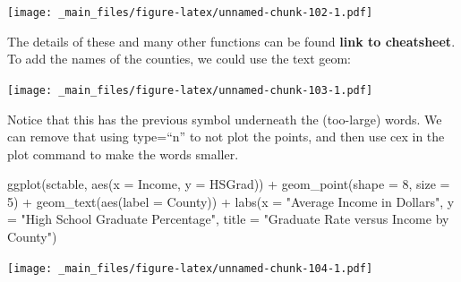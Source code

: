 \documentclass[
]{book}
\newenvironment{Shaded}{\begin{snugshade}}{\end{snugshade}}
\newcommand{\AttributeTok}[1]{\textcolor[rgb]{0.77,0.63,0.00}{#1}}
\newcommand{\DecValTok}[1]{\textcolor[rgb]{0.00,0.00,0.81}{#1}}
\newcommand{\FunctionTok}[1]{\textcolor[rgb]{0.00,0.00,0.00}{#1}}
\newcommand{\NormalTok}[1]{#1}
\newcommand{\SpecialCharTok}[1]{\textcolor[rgb]{0.00,0.00,0.00}{#1}}
\newcommand{\StringTok}[1]{\textcolor[rgb]{0.31,0.60,0.02}{#1}}
\begin{document}
\texttt{[image: \_main\_files/figure-latex/unnamed-chunk-102-1.pdf]}

The details of these and many other functions can be found \textbf{link to cheatsheet}. To add the names of the counties, we could use the text geom:

\begin{Shaded}
\end{Shaded}

\texttt{[image: \_main\_files/figure-latex/unnamed-chunk-103-1.pdf]}

Notice that this has the previous symbol underneath the (too-large) words. We can remove that using type=``n'' to not plot the points, and then use cex in the plot command to make the words smaller.

\begin{Shaded}
\begin{Highlighting}[]
\FunctionTok{ggplot}\NormalTok{(sctable, }\FunctionTok{aes}\NormalTok{(}\AttributeTok{x =}\NormalTok{ Income, }\AttributeTok{y =}\NormalTok{ HSGrad)) }\SpecialCharTok{+}
  \FunctionTok{geom\_point}\NormalTok{(}\AttributeTok{shape =} \DecValTok{8}\NormalTok{, }\AttributeTok{size =} \DecValTok{5}\NormalTok{) }\SpecialCharTok{+}
  \FunctionTok{geom\_text}\NormalTok{(}\FunctionTok{aes}\NormalTok{(}\AttributeTok{label =}\NormalTok{ County)) }\SpecialCharTok{+}
  \FunctionTok{labs}\NormalTok{(}\AttributeTok{x =} \StringTok{"Average Income in Dollars"}\NormalTok{,}
       \AttributeTok{y =} \StringTok{"High School Graduate Percentage"}\NormalTok{,}
       \AttributeTok{title =} \StringTok{"Graduate Rate versus Income by County"}\NormalTok{)}
\end{Highlighting}
\end{Shaded}

\texttt{[image: \_main\_files/figure-latex/unnamed-chunk-104-1.pdf]}
\end{document}
